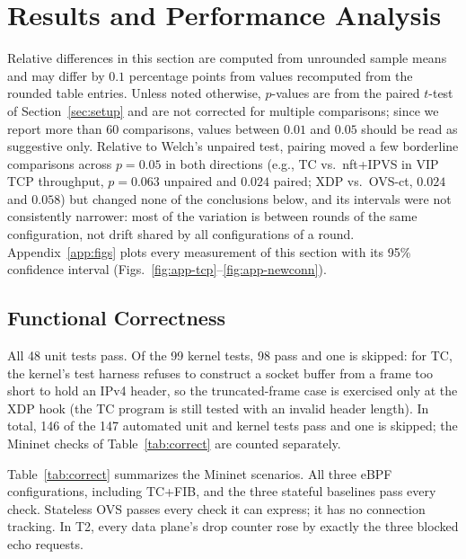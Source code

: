 \documentclass[conference]{IEEEtran}
\begin{document}
\section{Results and Performance Analysis}
\label{sec:results}
Relative differences in this section are computed from unrounded sample
means and may differ by $0.1$ percentage points from values recomputed from
the rounded table entries. Unless noted otherwise, $p$-values are from the
paired $t$-test of Section~\ref{sec:setup} and are not corrected for
multiple comparisons; since we report more than 60 comparisons, values
between $0.01$ and $0.05$ should be read as suggestive only. Relative to
Welch's unpaired test, pairing moved a few borderline comparisons across
$p=0.05$ in both directions (e.g., TC vs.\ nft+IPVS in VIP TCP throughput,
$p=0.063$ unpaired and $0.024$ paired; XDP vs.\ OVS-ct, $0.024$ and $0.058$)
but changed none of the conclusions below, and its intervals were not
consistently narrower: most of the variation is between rounds of the same
configuration, not drift shared by all configurations of a round.
Appendix~\ref{app:figs} plots every measurement of this section with its
95\% confidence interval (Figs.~\ref{fig:app-tcp}--\ref{fig:app-newconn}).

\subsection{Functional Correctness}
All 48 unit tests pass. Of the 99 kernel tests, 98 pass and one is skipped:
for TC, the kernel's test harness refuses to construct a socket buffer from a
frame too short to hold an IPv4 header, so the truncated-frame case is
exercised only at the XDP hook (the TC program is still tested with an
invalid header length). In total, 146 of the 147 automated unit and kernel
tests pass and one is skipped; the Mininet checks of Table~\ref{tab:correct}
are counted separately.

Table~\ref{tab:correct} summarizes the Mininet scenarios. All three eBPF
configurations, including TC+FIB, and the three stateful baselines pass every
check. Stateless OVS passes every check it can express; it has no connection
tracking. In T2, every data plane's drop counter rose by exactly the three
blocked echo requests.
\end{document}
